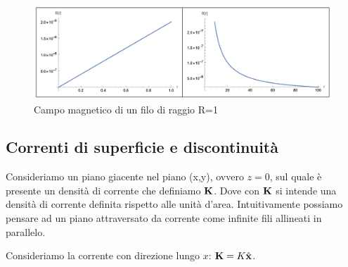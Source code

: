 \begin{figure}[!ht]
\vspace{0.1in}
\includegraphics[scale = 0.48]{images/wiremagneticfield}	
\centering
\vspace{0.1in}
\caption{Campo magnetico di un filo di raggio R=1}
\end{figure}

\subsection{Correnti di superficie e discontinuit\`a}

Consideriamo un piano giacente nel piano (x,y), ovvero $z = 0$, sul quale \`e presente un densit\`a di corrente che definiamo $\bold{K}$. Dove con $\bold{K}$ si intende una densit\`a di corrente definita rispetto alle unit\`a d'area. Intuitivamente possiamo pensare ad un piano attraversato da corrente come infinite fili allineati in parallelo.

Consideriamo la corrente con direzione lungo $x$: $\bold{K} = K \hat{\bold{x}}$.
\newline

